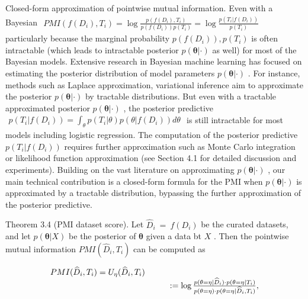 Closed-form approximation of pointwise mutual information. Even with a
Bayesian
\(\begin{array} { r } { P M I ( f ( D _ { i } ) , T _ { i } ) = \log \frac { p ( f ( D _ { i } ) , T _ { i } ) } { p ( f ( D _ { i } ) ) p ( T _ { i } ) } = \log \frac { p ( T _ { i } | f ( D _ { i } ) ) } { p ( T _ { i } ) } } \end{array}\)
particularly because the marginal probability
\(p ( f ( D _ { i } ) ) , p ( T _ { i } )\) is often intractable (which
leads to intractable posterior \(p ( \pmb \theta | \cdot )\) as well)
for most of the Bayesian models. Extensive research in Bayesian machine
learning has focused on estimating the posterior distribution of model
parameters \(p ( \pmb \theta | \cdot )\) . For instance, methods such as
Laplace approximation, variational inference aim to approximate the
posterior \(p ( \pmb \theta | \cdot )\) by tractable distributions. But
even with a tractable approximated posterior
\(p ( \pmb \theta | \cdot )\) , the posterior predictive
\(\begin{array} { r } { p ( T _ { i } | f ( D _ { i } ) ) = \int _ { \theta } p ( T _ { i } | \theta ) p ( \theta | f ( D _ { i } ) ) d \theta } \end{array}\)
is still intractable for most models including logistic regression. The
computation of the posterior predictive
\(p ( T _ { i } | f ( D _ { i } ) )\) requires further approximation
such as Monte Carlo integration or likelihood function approximation
(see Section 4.1 for detailed discussion and experiments). Building on
the vast literature on approximating \(p ( \pmb \theta | \cdot )\) , our
main technical contribution is a closed-form formula for the PMI when
\(p ( \pmb \theta | \cdot )\) is approximated by a tractable
distribution, bypassing the further approximation of the posterior
predictive.

Theorem 3.4 (PMI dataset score). Let
\(\widehat { D } _ { i } \ = \ f ( D _ { i } )\) be the curated
datasets, and let \(p ( \pmb \theta | X )\) be the posterior of
\(\pmb \theta\) given a data bt \(X\) . Then the pointwise mutual
information \(P M I ( \widehat { D } _ { i } , T _ { i } )\) can be
computed as

\[
\begin{array} { r l r } {  { P M I ( \widehat { D } _ { i } , T _ { i } ) = U _ { \eta } ( \widehat { D } _ { i } , T _ { i } ) } } \\ & { } & { \quad : = \log \frac { p ( \theta = \eta | \widehat { D } _ { i } ) \cdot p ( \theta = \eta | T _ { i } ) } { p ( \theta = \eta ) \cdot p ( \theta = \eta | \widehat { D } _ { i } , T _ { i } ) } , } \end{array}
\]

